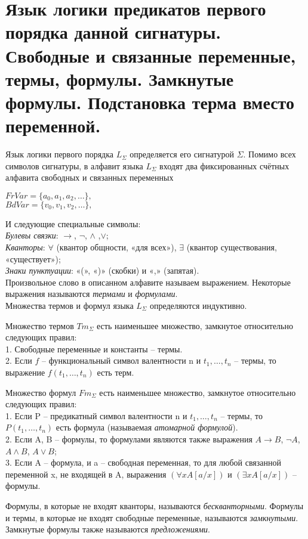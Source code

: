 \section{Язык логики предикатов первого порядка данной сигнатуры. Свободные
и связанные переменные, термы, формулы. Замкнутые формулы. Подстановка терма вместо переменной.}

\begin{definition}
	Язык логики первого порядка $L_{\Sigma }$ определяется его сигнатурой $\varSigma $. Помимо всех
	символов сигнатуры, в алфавит языка $L_{\Sigma}$ входят два фиксированных счётных
	алфавита свободных и связанных переменных

	\begin{center}
		$ FrVar = \{a_{0}, a_{1}, a_{2}, \ldots \},$ \\
		$ BdVar = \{v_{0}, v_{1},v_{2}, \ldots \},  \label{formula4}  $

	\end{center}
	И следующие специальные символы:\\
	\textit{Булевы связки}: $\rightarrow$, $\neg$, $\wedge$ ,$ \vee $;\\
	\textit{Кванторы}: $\forall$ (квантор общности, «для всех»), $\exists$ (квантор существования, «существует»);\\
	\textit{Знаки пунктуации}: «(», «)» (скобки) и «,» (запятая).\\
	Произвольное слово в описанном алфавите называем выражением. Некоторые выражения называются \textit{термами} и
	\textit{формулами}.\\
	Множества термов и формул языка $L_{\Sigma }$ определяются индуктивно.
\end{definition}

\begin{definition}
	Множество термов $Tm_{\Sigma }$ есть наименьшее множество, замкнутое относительно следующих правил:\\
	1. Свободные переменные и константы -- термы.\\
	2. Если $f$ -- функциональный символ валентности n и $t_{1}, \ldots ,t_{n}  $ -- термы,
	то выражение $f(t_{1}, \ldots , t_{n})$ есть терм.
\end{definition}


\begin{definition}
	Множество формул $Fm_{\Sigma}$ есть наименьшее множество,
	замкнутое относительно следующих правил:\\
	1. Если P -- предикатный символ валентности n и $t_{1}, \ldots,t_{n}$ -- термы,
	то $P(t_{1}, \ldots , t_{n})$ есть формула (называемая \textit{атомарной формулой}).\\
	2. Если A, B -- формулы, то формулами являются также выражения $A\rightarrow B$, $\neg A$, $A\wedge B$, $ A\vee B $; \\
	3. Если A -- формула, и a -- свободная переменная, то для любой связанной
	переменной x, не входящей в A, выражения $(\forall x A[a/x])$ и $(\exists x A[a/x]) $ -- формулы. 
\end{definition}

Формулы, в которые не входят кванторы, называются \textit{бескванторными}. Формулы и термы, в которые не входят
свободные переменные, называются \textit{замкнутыми}. Замкнутые формулы также называются \textit{предложениями}.


